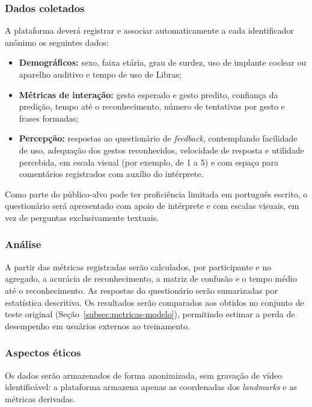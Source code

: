 \subsubsection{Dados coletados}

A plataforma deverá registrar e associar automaticamente a cada identificador
anônimo os seguintes dados:

\begin{itemize}[leftmargin=2cm]
  \item \textbf{Demográficos:} sexo, faixa etária, grau de surdez, uso de
  implante coclear ou aparelho auditivo e tempo de uso de Libras;
  \item \textbf{Métricas de interação:} gesto esperado e gesto predito, confiança
  da predição, tempo até o reconhecimento, número de tentativas por gesto e
  frases formadas;
  \item \textbf{Percepção:} respostas ao questionário de \textit{feedback},
  contemplando facilidade de uso, adequação dos gestos reconhecidos, velocidade
  de resposta e utilidade percebida, em escala visual (por exemplo, de 1 a 5) e
  com espaço para comentários registrados com auxílio do intérprete.
\end{itemize}

Como parte do público-alvo pode ter proficiência limitada em português escrito, o
questionário será apresentado com apoio de intérprete e com escalas visuais, em
vez de perguntas exclusivamente textuais.

\subsubsection{Análise}

A partir das métricas registradas serão calculados, por participante e no
agregado, a acurácia de reconhecimento, a matriz de confusão e o tempo médio até
o reconhecimento. As respostas do questionário serão sumarizadas por estatística
descritiva. Os resultados serão comparados aos obtidos no conjunto de teste
original (Seção~\ref{subsec:metricas-modelo}), permitindo estimar a perda de
desempenho em usuários externos ao treinamento.

\subsubsection{Aspectos éticos}

Os dados serão armazenados de forma anonimizada, sem gravação de vídeo
identificável: a plataforma armazena apenas as coordenadas dos \textit{landmarks}
e as métricas derivadas.

